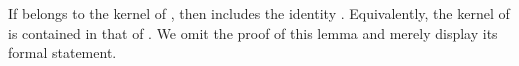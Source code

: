 \begin{code}
\AgdaSymbol{\}\{}\AgdaSymbol{\}}\AgdaSpace{}%
\AgdaSymbol{(}\AgdaSpace{}%
\AgdaSymbol{)}\AgdaSpace{}%
\AgdaSpace{}%
\AgdaSpace{}%
\<%
\\
%
\>[2]\AgdaSpace{}%
\AgdaSymbol{:}\AgdaSpace{}%
\AgdaSymbol{(}\AgdaSymbol{\{}\AgdaSpace{}%
\AgdaSymbol{=}\AgdaSpace{}%
\AgdaSymbol{\}}\AgdaSpace{}%
\AgdaSpace{}%
\AgdaSymbol{)}\AgdaSpace{}%
\AgdaSpace{}%
\AgdaSymbol{(}\AgdaSymbol{\{}\AgdaSpace{}%
\AgdaSymbol{=}\AgdaSpace{}%
\AgdaSymbol{\}}\AgdaSpace{}%
\AgdaSpace{}%
\AgdaSymbol{)}\<%
\\
%
\>[2]\AgdaSpace{}%
\AgdaSymbol{=}\AgdaSpace{}%
\AgdaSpace{}%
\AgdaSymbol{(}\AgdaSpace{}%
\AgdaSymbol{(}\AgdaSpace{}%
\AgdaSymbol{))}\AgdaSpace{}%
\AgdaSymbol{(}\AgdaSpace{}%
\AgdaSpace{}%
\AgdaSymbol{(}\AgdaSpace{}%
\AgdaSymbol{))}\<%
\end{code}
\fi
\begin{code}%
\>[0]\<%
\\
%
\>[1]\AgdaSpace{}%
\AgdaSymbol{:}\AgdaSpace{}%
\AgdaSpace{}%
\AgdaOperator{\AgdaFunction{𝔽[}}\AgdaSpace{}%
\AgdaSpace{}%
\AgdaOperator{\AgdaFunction{]}}\AgdaSpace{}%
\<%
\\
%
\>[1]\AgdaSpace{}%
\AgdaSymbol{=}\AgdaSpace{}%
\AgdaSpace{}%
\AgdaSpace{}%
\AgdaSpace{}%
\AgdaSpace{}%
\AgdaOperator{\AgdaFunction{homF[}}\AgdaSpace{}%
\AgdaSpace{}%
\AgdaOperator{\AgdaFunction{]}}\AgdaSpace{}%
\AgdaSpace{}%
\AgdaSymbol{(}\AgdaSpace{}%
\AgdaSpace{}%
\AgdaOperator{\AgdaFunction{epiF[}}\AgdaSpace{}%
\AgdaSpace{}%
\AgdaOperator{\AgdaFunction{]}}\AgdaSpace{}%
\AgdaSymbol{)}\AgdaSpace{}%
\<%
\\
\>[0]\<%
\end{code}
If  belongs to the kernel of , then
  includes the identity   .
Equivalently,
the kernel of  is contained in that of .
\ifshort
We omit the proof of this lemma and merely display its formal statement.
\else
\fi

